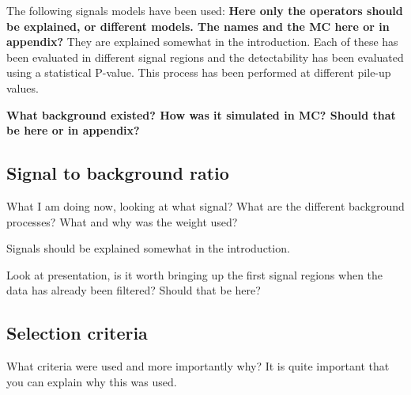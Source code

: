 The following signals models have been used:
\textbf{Here only the operators should be explained, or different models. The names and the MC here or in appendix?} They are explained somewhat in the introduction.
Each of these has been evaluated in different signal regions and the detectability has been evaluated using a statistical P-value. This process has been performed at different pile-up values. 

\textbf{What background existed? How was it simulated in MC? Should that be here or in appendix?}


\subsection{Signal to background ratio}
What I am doing now, looking at what signal? What are the different background processes? What and why was the weight used?

Signals should be explained somewhat in the introduction.



Look at presentation, is it worth bringing up the first signal regions when the data has already been filtered? Should that be here?
 
\subsection{Selection criteria}
What criteria were used and more importantly why? It is quite important that you can explain why this was used.

